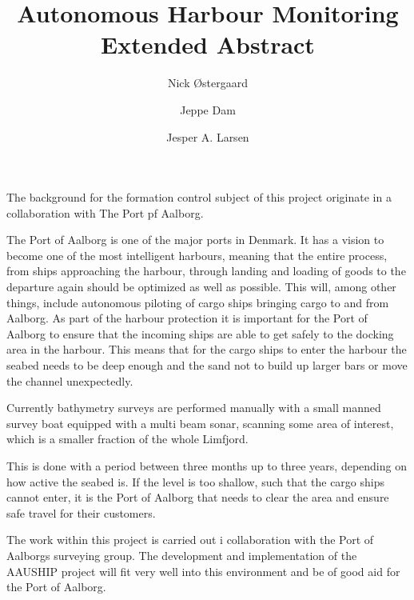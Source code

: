 \documentclass[a4paper,12pt]{article}
\begin{document}
\title{\vspace{-2cm}Autonomous Harbour Monitoring\\
\vspace{0.3cm}\small{Extended Abstract}}
\author{Nick Østergaard \and Jeppe Dam \and Jesper A. Larsen}
\maketitle


The background for the formation control subject of this project
originate in a collaboration with The Port pf Aalborg.

The Port of Aalborg is one of the major ports in Denmark. It has a vision to become one of the most
intelligent harbours, meaning that the entire process, from ships approaching the harbour, through landing and loading of goods to the departure again should be optimized as well as possible. This will, among other
things, include autonomous piloting of cargo ships bringing cargo to
and from Aalborg. As part of the harbour protection it is important
for the Port of Aalborg to ensure that the incoming ships are able to
get safely to the docking area in the harbour. This means that for the
cargo ships to enter the harbour the seabed needs to be deep enough
and the sand not to build up larger bars or move the channel
unexpectedly.

Currently bathymetry surveys are performed manually with a small
manned survey boat equipped with a multi beam sonar, scanning some
area of interest, which is a smaller fraction of the whole Limfjord.

This is done with a period between three months up to three years,
depending on how active the seabed is. If the level is too shallow,
such that the cargo ships cannot enter, it is the Port of Aalborg that
needs to clear the area and ensure safe travel for their customers.

The work within this project is carried out i collaboration with the Port of
Aalborgs surveying group. The development and implementation of
the AAUSHIP project will fit very well into this environment and be of
good aid for the Port of Aalborg.
\end{document}
